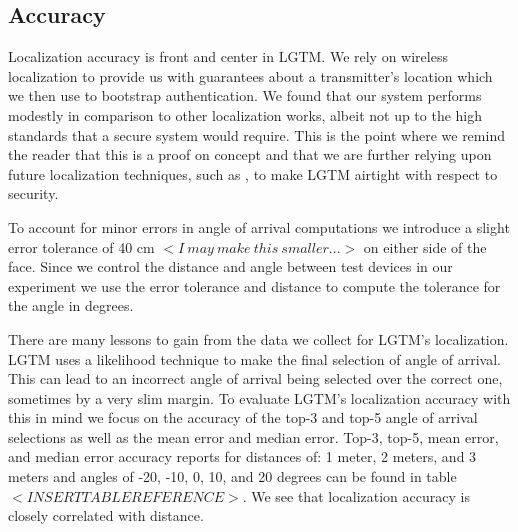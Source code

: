 \documentclass[12pt]{report}
\begin{document}
\subsection{Accuracy}
Localization accuracy is front and center in LGTM. We rely on wireless localization to provide us with guarantees about a transmitter's location which we then use to bootstrap authentication. We found that our system performs modestly in comparison to other localization works, albeit not up to the high standards that a secure system would require. This is the point where we remind the reader that this is a proof on concept and that we are further relying upon future localization techniques, such as \cite{ChronosSingleAPLocalizationVasisht2016}, to make LGTM airtight with respect to security. \par

To account for minor errors in angle of arrival computations we introduce a slight error tolerance of 40 cm $<I \: may \: make \: this \: smaller...>$ on either side of the face. Since we control the distance and angle between test devices in our experiment we use the error tolerance and distance to compute the tolerance for the angle in degrees. \par

There are many lessons to gain from the data we collect for LGTM's localization. LGTM uses a likelihood technique to make the final selection of angle of arrival. This can lead to an incorrect angle of arrival being selected over the correct one, sometimes by a very slim margin. To evaluate LGTM's localization accuracy with this in mind we focus on the accuracy of the top-3 and top-5 angle of arrival selections as well as the mean error and median error. Top-3, top-5, mean error, and median error accuracy reports for distances of: 1 meter, 2 meters, and 3 meters and angles of -20, -10, 0, 10, and 20 degrees can be found in table $<INSERT TABLE REFERENCE>$. We see that localization accuracy is closely correlated with distance. \par
\end{document}
